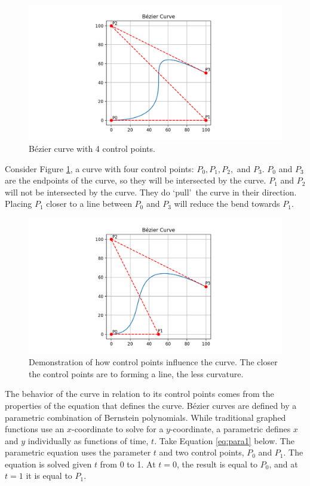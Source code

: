 \documentclass[12pt,letterpaper]{article}
\begin{document}
\begin{figure}[H]
    \includegraphics[width=15cm]{Figure_1}
    \centering
    \caption{B\'ezier curve with 4 control points.}
    \label{fig:demo}
\end{figure}

Consider Figure \ref{fig:demo}, a curve with four control points: $P_0, P_1, P_2,$ and $P_3$. $P_0$ and $P_3$ are the endpoints of the curve, so they will be intersected by the curve. $P_1$ and $P_2$ will not be intersected by the curve. They do \lq pull\rq \, the curve in their direction. Placing $P_1$ closer to a line between $P_0$ and $P_3$ will reduce the bend towards $P_1$.

\begin{figure}[H]
    \includegraphics[width=15cm]{Figure_2}
    \centering
    \caption{Demonstration of how control points influence the curve. The closer the control points are to forming a line, the less curvature.}
    \label{fig:demo2}
\end{figure}

The behavior of the curve in relation to its control points comes from the properties of the equation that defines the curve. B\'ezier curves are defined by a parametric combination of Bernstein polynomials. While traditional graphed functions use an $x$-coordinate to solve for a $y$-coordinate, a parametric defines $x$ and $y$ individually as functions of time, $t$. 
Take Equation \ref{eq:para1} below. The parametric equation uses the parameter $t$ and two control points, $P_0$ and $P_1$. The equation is solved given $t$ from 0 to 1. At $t=0$, the result is equal to $P_0$, and at $t=1$ it is equal to $P_1$.
\end{document}
